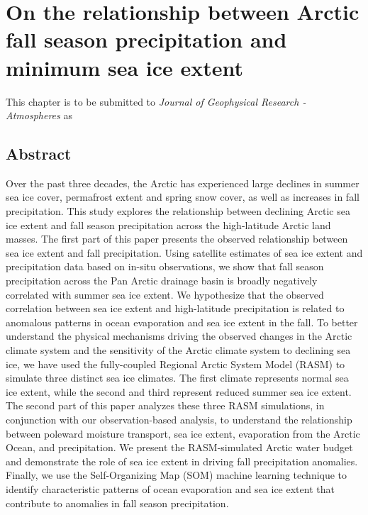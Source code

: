
\chapter{On the relationship between Arctic fall season precipitation and minimum sea ice extent}
\label{chap:fall_prec}

This chapter is to be submitted to \textit{Journal of Geophysical Research - Atmospheres} as


\section*{Abstract}

Over the past three decades, the Arctic has experienced large declines in summer sea ice cover, permafrost extent and spring snow cover, as well as increases in fall precipitation.
This study explores the relationship between declining Arctic sea ice extent and fall season precipitation across the high-latitude Arctic land masses.
The first part of this paper presents the observed relationship between sea ice extent and fall precipitation.
Using satellite estimates of sea ice extent and precipitation data based on in-situ observations, we show that fall season precipitation across the Pan Arctic drainage basin is broadly negatively correlated with summer sea ice extent.
We hypothesize that the observed correlation between sea ice extent and high-latitude precipitation is related to anomalous patterns in ocean evaporation and sea ice extent in the fall.
To better understand the physical mechanisms driving the observed changes in the Arctic climate system and the sensitivity of the Arctic climate system to declining sea ice, we have used the fully-coupled Regional Arctic System Model (RASM) to simulate three distinct sea ice climates.
The first climate represents normal sea ice extent, while the second and third represent reduced summer sea ice extent.
The second part of this paper analyzes these three RASM simulations, in conjunction with our observation-based analysis, to understand the relationship between poleward moisture transport, sea ice extent, evaporation from the Arctic Ocean, and precipitation.
We present the RASM-simulated Arctic water budget and demonstrate the role of sea ice extent in driving fall precipitation anomalies.
Finally, we use the Self-Organizing Map (SOM) machine learning technique to identify characteristic patterns of ocean evaporation and sea ice extent that contribute to anomalies in fall season precipitation.


